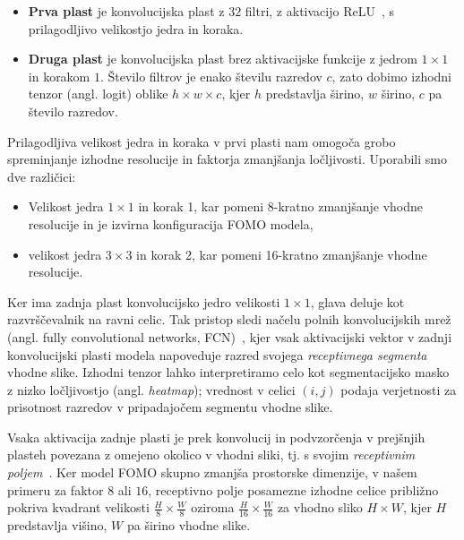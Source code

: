 \documentclass[a4paper,twoside,openright,12pt,slovene]{book}
\begin{document}
            \begin{itemize}
            \item \textbf{Prva plast} je konvolucijska plast z $32$ filtri, z aktivacijo ReLU~\cite{src:nair2010rectified-relu}, s prilagodljivo velikostjo jedra in koraka.
            \item \textbf{Druga plast} je konvolucijska plast brez aktivacijske funkcije z jedrom $1\times1$ in korakom $1$. Število filtrov je enako številu razredov $c$, zato dobimo izhodni tenzor (angl. logit) oblike $h\times w\times c$, kjer $h$ predstavlja širino, $w$ širino, $c$ pa število razredov.
            \end{itemize}

            Prilagodljiva velikost jedra in koraka v prvi plasti nam omogoča grobo spreminjanje izhodne resolucije in faktorja zmanjšanja ločljivosti. Uporabili smo dve različici:
            \begin{itemize}
                \item Velikost jedra $1 \times 1$ in korak 1, kar pomeni 8-kratno zmanjšanje vhodne resolucije in je izvirna konfiguracija FOMO modela,
                \item velikost jedra $3 \times 3$ in korak 2, kar pomeni 16-kratno zmanjšanje vhodne resolucije.
            \end{itemize}

            Ker ima zadnja plast konvolucijsko jedro velikosti $1\times1$, glava deluje kot razvrščevalnik na ravni celic. Tak pristop sledi načelu polnih konvolucijskih mrež (angl. fully convolutional networks, FCN)~\cite{src:long2015fully}, kjer vsak aktivacijski vektor v zadnji konvolucijski plasti modela napoveduje razred svojega \emph{receptivnega segmenta} vhodne slike. Izhodni tenzor lahko interpretiramo celo kot segmentacijsko masko z nizko ločljivostjo (angl. \textit{heatmap}); vrednost v celici $(i,j)$ podaja verjetnosti za prisotnost razredov v pripadajočem segmentu vhodne slike.

            Vsaka aktivacija zadnje plasti je prek konvolucij in podvzorčenja v prejšnjih plasteh povezana z omejeno okolico v vhodni sliki, tj. s svojim \emph{receptivnim poljem}~\cite{src:long2015fully}. Ker model FOMO skupno zmanjša prostorske dimenzije, v našem primeru za faktor $8$ ali $16$, receptivno polje posamezne izhodne celice približno pokriva kvadrant velikosti $\tfrac{H}{8} \times \tfrac{W}{8}$ oziroma $\tfrac{H}{16} \times \tfrac{W}{16}$ za vhodno sliko $H \times W$, kjer $H$ predstavlja višino, $W$ pa širino vhodne slike.
\end{document}
